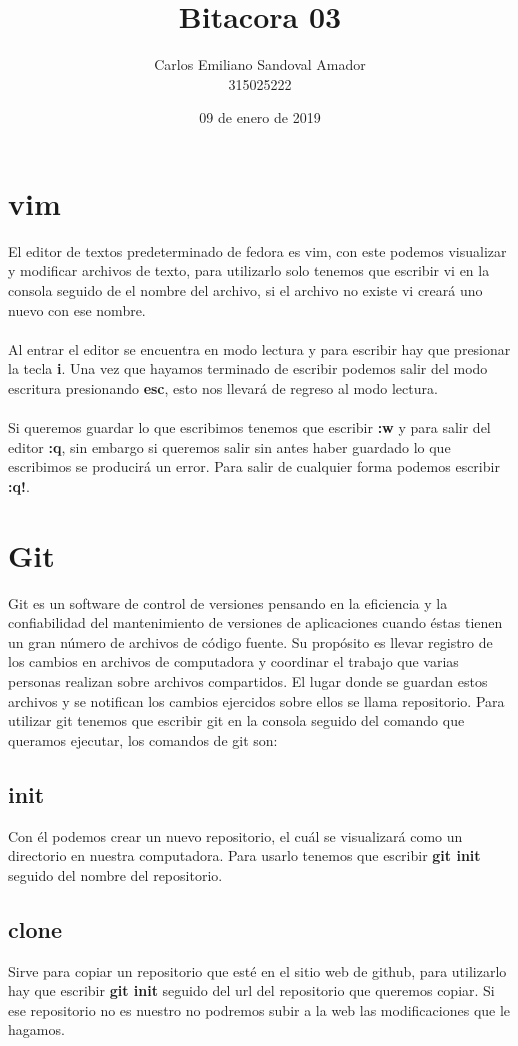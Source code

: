 \documentclass[letterpaper, 12pt, oneside]{article}%
\title{Bitacora 03}
\author{Carlos Emiliano Sandoval Amador \\ 315025222}
\date{09 de enero de 2019}
\begin{document}
	\maketitle
	\section{vim} %
	El editor de textos predeterminado de fedora es vim, con este podemos visualizar y modificar archivos de texto, para utilizarlo solo tenemos que escribir vi en la consola seguido de el nombre del archivo, si el archivo no existe vi creará uno nuevo con ese nombre.\\ \\ Al entrar el editor se encuentra en modo lectura y para escribir hay que presionar la tecla \textbf{i}. Una vez que hayamos terminado de escribir podemos salir del modo escritura presionando \textbf{esc}, esto nos llevará de regreso al modo lectura.\\ \\ Si queremos guardar lo que escribimos tenemos que escribir \textbf{:w} y para salir del editor \textbf{:q}, sin embargo si queremos salir sin antes haber guardado lo que escribimos se producirá un error. Para salir de cualquier forma podemos escribir \textbf{:q!}.
	\section{Git}
	{Git es un software de control de versiones pensando en la eficiencia y la confiabilidad del mantenimiento de versiones de aplicaciones cuando éstas tienen un gran número de archivos de código fuente. Su propósito es llevar registro de los cambios en archivos de computadora y coordinar el trabajo que varias personas realizan sobre archivos compartidos. El lugar donde se guardan estos archivos y se notifican los cambios ejercidos sobre ellos se llama repositorio.}
	{Para utilizar git tenemos que escribir git en la consola seguido del comando que queramos ejecutar, los comandos de git son:}
	\subsection{init} %
	{Con él podemos crear un nuevo repositorio, el cuál se visualizará como un directorio en nuestra computadora. Para usarlo tenemos que escribir \textbf{git init} seguido del nombre del repositorio.}
	\subsection{clone}
	{Sirve para copiar un repositorio que esté en el sitio web de github, para utilizarlo hay que escribir \textbf{git init} seguido del url del repositorio que queremos copiar. Si ese repositorio no es nuestro no podremos subir a la web las modificaciones que le hagamos.}
\end{document}
